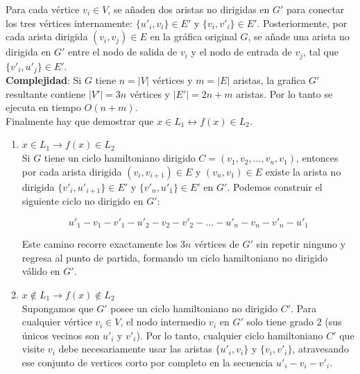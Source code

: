     Para cada vértice $v_i \in V$, se añaden dos aristas no dirigidas en $G'$ para conectar los tres vértices internamente: $\{u'_i, v_i\} \in E'$ y $\{v_i, v'_i\} \in E'$. Posteriormente, por cada arista dirigida $(v_i, v_j) \in E$ en la gráfica original $G$, se añade una arista no dirigida en $G'$ entre el nodo de salida de $v_i$ y el nodo de entrada de $v_j$, tal que $\{v'_i, u'_j\} \in E'$.\\

    \textbf{Complejidad}: Si $G$ tiene $n = |V|$ vértices y $m = |E|$ aristas, la grafica $G'$ resultante contiene $|V'| = 3n$ vértices y $|E'| = 2n + m$ aristas. Por lo tanto se ejecuta en tiempo $O(n + m)$.\\


    Finalmente hay que demostrar que $x \in L_1 \leftrightarrow f(x) \in L_2$. 
    \begin{enumerate}
        \item $x \in L_1 \rightarrow f(x) \in L_2$\\
        
        Si $G$ tiene un ciclo hamiltoniano dirigido $C = (v_1, v_2, \dots, v_n, v_1)$, entonces por cada arista dirigida $(v_i, v_{i+1}) \in E$ y $(v_n, v_1) \in E$ existe la arista no dirigida $\{v'_i, u'_{i+1}\} \in E'$ y $\{v'_n, u'_1\} \in E'$ en $G'$. Podemos construir el siguiente ciclo no dirigido en $G'$:
        
        $$u'_1 - v_1 - v'_1 - u'_2 - v_2 - v'_2 - \dots - u'_n - v_n - v'_n - u'_1$$
        
        Este camino recorre exactamente los $3n$ vértices de $G'$ sin repetir ninguno y regresa al punto de partida, formando un ciclo hamiltoniano no dirigido válido en $G'$.
        

        
        \item $x \notin L_1 \rightarrow f(x) \notin L_2$\\

        Supongamos que $G'$ posee un ciclo hamiltoniano no dirigido $C'$. Para cualquier vértice $v_i \in V$, el nodo intermedio $v_i$ en $G'$ solo tiene grado $2$ (sus únicos vecinos son $u'_i$ y $v'_i$). Por lo tanto, cualquier ciclo hamiltoniano $C'$ que visite $v_i$ debe necesariamente usar las aristas $\{u'_i, v_i\}$ y $\{v_i, v'_i\}$, atravesando ese conjunto de vertices corto por completo en la secuencia $u'_i - v_i - v'_i$.\\
        

\end{enumerate}
